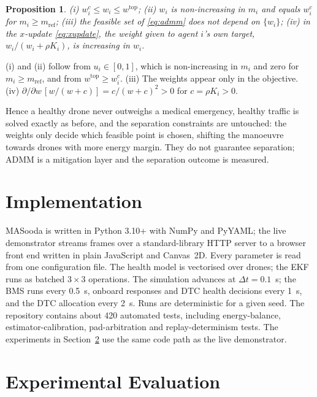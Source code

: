 \documentclass[journal]{IEEEtran}
\newtheorem{proposition}{Proposition}
\begin{document}
\begin{proposition}\label{prop:weights}
(i) $w^{c}_i \le w_i \le w^{\mathrm{top}}$; (ii) $w_i$ is non-increasing in $m_i$ and equals $w^{c}_i$ for $m_i \ge m_{\mathrm{ref}}$; (iii) the feasible set of \eqref{eq:admm} does not depend on $\{w_i\}$; (iv) in the $x$-update \eqref{eq:xupdate}, the weight given to agent $i$'s own target, $w_i/(w_i + \rho K_i)$, is increasing in $w_i$.
\end{proposition}
\begin{IEEEproof}
(i) and (ii) follow from $u_i \in [0,1]$, which is non-increasing in $m_i$ and zero for $m_i \ge m_{\mathrm{ref}}$, and from $w^{\mathrm{top}} \ge w^c_i$. (iii) The weights appear only in the objective. (iv) $\partial/\partial w\,[w/(w + c)] = c/(w + c)^2 > 0$ for $c = \rho K_i > 0$.
\end{IEEEproof}

Hence a healthy drone never outweighs a medical emergency, healthy traffic is solved exactly as before, and the separation constraints are untouched: the weights only decide which feasible point is chosen, shifting the manoeuvre towards drones with more energy margin. They do not guarantee separation; ADMM is a mitigation layer and the separation outcome is measured.

\section{Implementation}\label{sec:impl}
MASooda is written in Python 3.10+ with NumPy and PyYAML; the live demonstrator streams frames over a standard-library HTTP server to a browser front end written in plain JavaScript and Canvas~2D. Every parameter is read from one configuration file. The health model is vectorised over drones; the EKF runs as batched $3\times 3$ operations. The simulation advances at $\Delta t = 0.1$~s; the BMS runs every 0.5~s, onboard responses and DTC health decisions every 1~s, and the DTC allocation every 2~s. Runs are deterministic for a given seed. The repository contains about 420 automated tests, including energy-balance, estimator-calibration, pad-arbitration and replay-determinism tests. The experiments in Section~\ref{sec:results} use the same code path as the live demonstrator.

\section{Experimental Evaluation}\label{sec:results}
\end{document}
